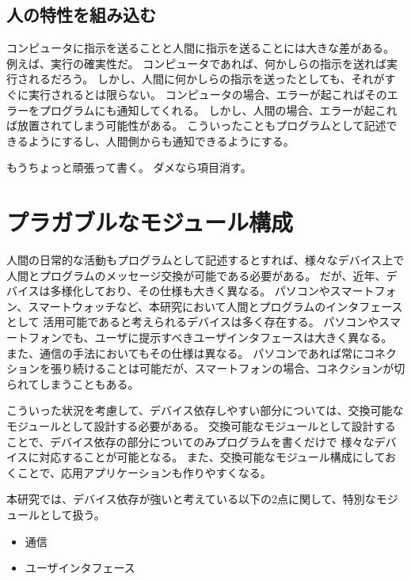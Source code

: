 \subsection{人の特性を組み込む}\label{ux4ebaux306eux7279ux6027ux3092ux7d44ux307fux8fbcux3080}

コンピュータに指示を送ることと人間に指示を送ることには大きな差がある。
例えば、実行の確実性だ。
コンピュータであれば、何かしらの指示を送れば実行されるだろう。
しかし、人間に何かしらの指示を送ったとしても、それがすぐに実行されるとは限らない。
コンピュータの場合、エラーが起こればそのエラーをプログラムにも通知してくれる。
しかし、人間の場合、エラーが起これば放置されてしまう可能性がある。
こういったこともプログラムとして記述できるようにするし、人間側からも通知できるようにする。

もうちょっと頑張って書く。 ダメなら項目消す。

\section{プラガブルなモジュール構成}\label{sec:plaggable-module-design}

人間の日常的な活動もプログラムとして記述するとすれば、様々なデバイス上で人間とプログラムのメッセージ交換が可能である必要がある。
だが、近年、デバイスは多様化しており、その仕様も大きく異なる。
パソコンやスマートフォン、スマートウォッチなど、本研究において人間とプログラムのインタフェースとして
活用可能であると考えられるデバイスは多く存在する。
パソコンやスマートフォンでも、ユーザに提示すべきユーザインタフェースは大きく異なる。
また、通信の手法においてもその仕様は異なる。
パソコンであれば常にコネクションを張り続けることは可能だが、スマートフォンの場合、コネクションが切られてしまうこともある。

こういった状況を考慮して、デバイス依存しやすい部分については、交換可能なモジュールとして設計する必要がある。
交換可能なモジュールとして設計することで、デバイス依存の部分についてのみプログラムを書くだけで
様々なデバイスに対応することが可能となる。
また、交換可能なモジュール構成にしておくことで、応用アプリケーションも作りやすくなる。

本研究では、デバイス依存が強いと考えている以下の2点に関して、特別なモジュールとして扱う。

\begin{itemize}
\itemsep1pt\parskip0pt
\item
  通信
\item
  ユーザインタフェース
\end{itemize}

